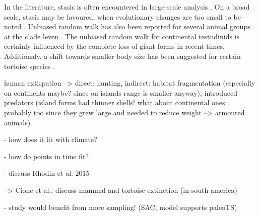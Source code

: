 In the literature, stasis is often encountered in large-scale analysis \citep{Smith2016, Hunt2006,Hunt2007,Hunt2015}. On a broad scale, stasis may be favoured, when evolutionary changes are too small to be noted \citep{Hunt2015}.
Unbiased random walk has also been reported for several animal groups at the clade leven \citep{Smith2016}.
The unbiased random walk for continental testudinids is certainly influenced by the complete loss of giant forms in recent times. Additionaly, a shift towards smaller body size has been suggested for certain tortoise species \citep{Klein2000,Steele2005,Franz2005,Speth2002}.
 




human extirpation --> direct: hunting, indirect: habitat fragmentation (especially on continents maybe? since on islands range is smaller anyway), introduced predators (island forms had thinner shells! what about continental ones... probably too since they grew large and needed to reduce weight --> armoured animals)

- how does it fit with climate? 

- how do points in time fit?

- discuss Rhodin et al. 2015

--> Cione et al.: discuss mammal and tortoise extinction (in south america)






- study would benefit from more sampling! (SAC, model supports paleoTS)

